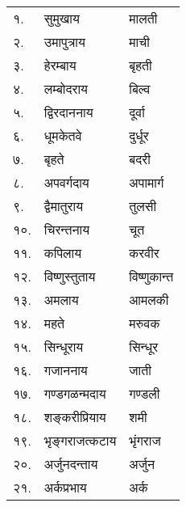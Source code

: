 \begin{center}
\begin{longtable}{ll@{~नमः — }l@{-पत्रं समर्पयामि}}
    १. & सुमुखाय &  मालती\\
    २. & उमापुत्राय &  माची\\
    ३. & हेरम्बाय & बृहती\\
    ४. & लम्बोदराय &  बिल्व\\
    ५. & द्विरदाननाय &  दूर्वा\\
    ६. & धूमकेतवे &  दुर्धूर\\
    ७. & बृहते &  बदरी\\
    ८. & अपवर्गदाय & अपामार्ग\\
    ९. & द्वैमातुराय &  तुलसी\\
    १०. & चिरन्तनाय &  चूत\\
    ११. & कपिलाय &  करवीर\\
    १२. & विष्णुस्तुताय &  विष्णुकान्त\\
    १३. & अमलाय &  आमलकी\\
    १४. & महते &  मरुवक\\
    १५. & सिन्धूराय &  सिन्धूर\\
    १६. & गजाननाय &  जाती\\
    १७. & गण्डगळन्मदाय &  गण्डली\\
    १८. & शङ्करीप्रियाय &  शमी\\
    १९. & भृङ्गराजत्कटाय &  भृंगराज\\
    २०. & अर्जुनदन्ताय &  अर्जुन\\
    २१. & अर्कप्रभाय &  अर्क\\
\end{longtable}
    



\end{center}
